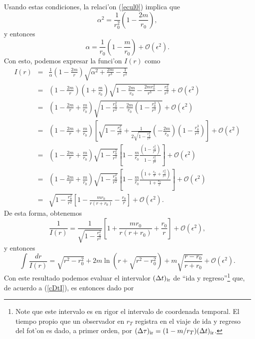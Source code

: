 Usando estas condiciones, la relaci'on (\ref{ecul0}) implica que
\begin{equation}
 \alpha^2=\frac{1}{r^2_0}\left(1-\frac{2m}{r_0}\right),
\end{equation}
y entonces
\begin{equation}
\alpha=\frac{1}{r_0}\left(1-\frac{m}{r_0}\right)+\mathcal{O}(\epsilon^2).
\end{equation}
Con esto, podemos expresar la funci'on $I(r)$ como
\begin{eqnarray}
 I(r)&=&\frac{1}{\alpha}\left(1-\frac{2m}{r}\right)\sqrt{\alpha^2+\frac{2m}{r^3}-\frac{1}{r^2}} \\
&=&\left(1-\frac{2m}{r}\right)\left(1+\frac{m}{r_0}\right)\sqrt{1-\frac{2m}{r_0}-\frac{2mr_0^2}{r^3}-\frac{r_0^2}{r^2}} +\mathcal{O}(\epsilon^2)\\
&=&\left(1-\frac{2m}{r}+\frac{m}{r_0}\right)\sqrt{1-\frac{r_0^2}{r^2}-\frac{2m}{r_0}\left(1-\frac{r_0^3}{r^3}\right)}+\mathcal{O}(\epsilon^2) \\
&=&\left(1-\frac{2m}{r}+\frac{m}{r_0}\right)\left[\sqrt{1-\frac{r_0^2}{r^2}}+\frac{1}{2\sqrt{1-\frac{r_0^2}{r^2}}}\left(-\frac{2m}{r_0}\right)\left(1-\frac{r_0^3}{r^3}\right)\right] +\mathcal{O}(\epsilon^2)\\
&=&\left(1-\frac{2m}{r}+\frac{m}{r_0}\right)\sqrt{1-\frac{r_0^2}{r^2}}\left[1-\frac{m}{r_0}\frac{\left(1-\frac{r_0^3}{r^3}\right)}{1-\frac{r_0^2}{r^2}}\right] +\mathcal{O}(\epsilon^2)\\
&=&\left(1-\frac{2m}{r}+\frac{m}{r_0}\right)\sqrt{1-\frac{r_0^2}{r^2}}\left[1-\frac{m}{r_0}\frac{\left(1+\frac{r_0}{r}+\frac{r_0^2}{r^2}\right)}{1+\frac{r_0}{r}}\right]+\mathcal{O}(\epsilon^2) \\
&=&\sqrt{1-\frac{r_0^2}{r^2}}\left[1-\frac{mr_0}{r(r+r_0)}-\frac{r_0}{r}\right]+\mathcal{O}(\epsilon^2).
\end{eqnarray}
De esta forma, obtenemos
\begin{equation}
 \frac{1}{I(r)}=\frac{1}{\sqrt{1-\frac{r_0^2}{r^2}}}\left[1+\frac{mr_0}{r(r+r_0)}+\frac{r_0}{r}\right]+\mathcal{O}(\epsilon^2),
\end{equation}
y entonces
\begin{equation}
 \int\frac{dr}{I(r)}=\sqrt{r^2-r_0^2}+2m\ln\left(r+\sqrt{r^2-r_0^2}\right)+m\sqrt{\frac{r-r_0}{r+r_0}}+\mathcal{O}(\epsilon^2).
\end{equation}
Con este resultado podemos evaluar el intervalor $(\Delta t)_{\rm ir}$ de ``ida y regreso''\footnote{Note que este intervalo es en rigor el intervalo de coordenada temporal. El tiempo propio que un observador en $r_T$ registra en el viaje de ida y regreso del fot'on es dado, a primer orden, por $(\Delta\tau)_{\rm ir}=(1-m/r_T)(\Delta t)_{\rm ir}$.} que, de acuerdo a (\ref{cDtI}), es entonces dado por
